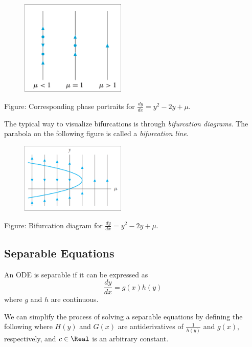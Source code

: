 \begin{figure}[H]
    \centering
    \includegraphics[width=50mm]{content/diffeq/images/bifurcation_1.png}
\end{figure}
Figure: Corresponding phase portraits for $\frac{dy}{dx} = y^2 - 2y + \mu$.

The typical way to visualize bifurcations is through \textit{bifurcation diagrams}. The parabola on the following figure is called a \textit{bifurcation line}.

\begin{figure}[H]
    \centering
    \includegraphics[width=50mm]{content/diffeq/images/bifurcation_2.png}
\end{figure}
Figure: Bifurcation diagram for $\frac{dy}{dx} = y^2 - 2y + \mu$.

\subsection{Separable Equations}

\begin{definition}
    An ODE is separable if it can be expressed as 
    \[
        \frac{dy}{dx} = g(x)h(y)
    \]
    where $g$ and $h$ are continuous.
\end{definition}

We can simplify the process of solving a separable equations by defining the following where $H(y)$ and $G(x)$ are antiderivatives of $\frac{1}{h(y)}$ and $g(x)$, respectively, and $c \in \Real$ is an arbitrary constant.

